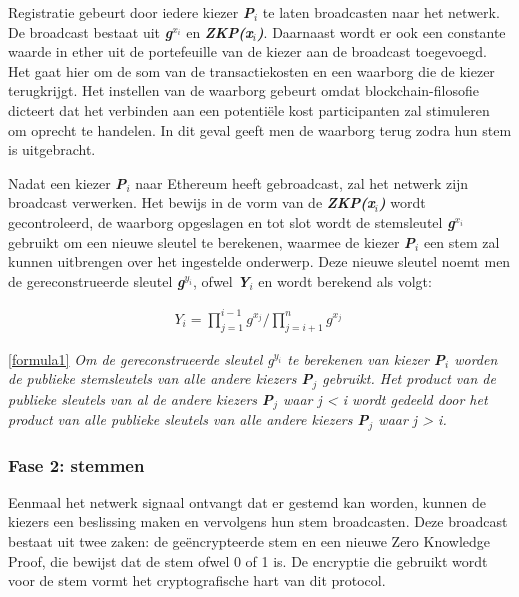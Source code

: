 			Registratie gebeurt door iedere kiezer \textbf{\textit{P$_{i}$}} te laten broadcasten naar het netwerk. De broadcast bestaat uit \textbf{\textit{g$^{x_{i}}$}}  en \textbf{\textit{ZKP(x$_{i}$)}}. Daarnaast wordt er ook een constante waarde in ether uit de portefeuille van de kiezer aan de broadcast toegevoegd. Het gaat hier om de som van de transactiekosten en een waarborg die de kiezer terugkrijgt. Het instellen van de waarborg gebeurt omdat blockchain-filosofie dicteert dat het verbinden aan een potentiële kost participanten zal stimuleren om oprecht te handelen. In dit geval geeft men de waarborg terug zodra hun stem is uitgebracht. 
			
			Nadat een kiezer \textbf{\textit{P$_{i}$}}  naar Ethereum heeft gebroadcast, zal het netwerk zijn broadcast verwerken. Het bewijs in de vorm van de \textbf{\textit{ZKP(x$_{i}$)}} wordt gecontroleerd, de waarborg opgeslagen en tot slot wordt de stemsleutel \textbf{\textit{g$^{x_{i}}$}} gebruikt om een nieuwe sleutel te berekenen, waarmee de kiezer \textbf{\textit{P$_{i}$}} een stem zal kunnen uitbrengen over het ingestelde onderwerp. Deze nieuwe sleutel noemt men de gereconstrueerde sleutel \textbf{\textit{g$^{y_{i}}$}}, ofwel \textbf{\textit{Y$_{i}$}} en wordt berekend als volgt: 
			\begin{ceqn}
				\begin{align}
					Y_{i} = \prod_{j=1}^{i-1}g^{x_{j}}  / \prod_{j=i+1}^{n}g^{x_{j}} \label{formula1}\
				\end{align}
			\end{ceqn}
			
			\eqref{formula1} \textit{Om de gereconstrueerde sleutel g$^{y_{i}}$ te berekenen van kiezer \textbf{P$_{i}$} worden de publieke stemsleutels van alle andere kiezers \textbf{P$_{j}$} gebruikt. Het product van de publieke sleutels van al de andere kiezers \textbf{P$_{j}$} waar j < i wordt gedeeld door het product van alle publieke sleutels van alle andere kiezers \textbf{P$_{j}$} waar  j > i.}
			
		\subsubsection*{Fase 2: stemmen}
			Eenmaal het netwerk signaal ontvangt dat er gestemd kan worden, kunnen de kiezers een beslissing maken en vervolgens hun stem broadcasten. Deze broadcast bestaat uit twee zaken: de geëncrypteerde stem en een nieuwe Zero Knowledge Proof, die bewijst dat de stem ofwel 0 of 1 is. De encryptie die gebruikt wordt voor de stem vormt het cryptografische hart van dit protocol. 
			

